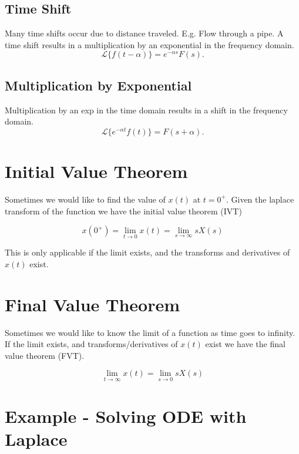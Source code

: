 \documentclass[12pt, a4paper]{report}
\begin{document}
  \subsection{Time Shift}
  Many time shifts occur due to distance traveled. E.g. Flow through a pipe. A time shift results in a multiplication by an exponential in the frequency domain.
  \[
      \mathcal{L}\{f(t-\alpha)\} = e^{-\alpha s}F(s)
    .\]

  \subsection{Multiplication by Exponential}
  Multiplication by an exp in the time domain results in a shift in the frequency domain.
  \[
      \mathcal{L}\{e^{-\alpha t}f(t)\} = F(s + \alpha)
    .\]

  \section{Initial Value Theorem}

  Sometimes we would like to find the value of $ x(t) $ at $ t = 0^+. $ Given the laplace transform of the function we have the initial value theorem (IVT)

  \begin{equation}
    x(0^+) = \lim_{t \rightarrow 0} x(t) = \lim_{s \rightarrow \infty} sX(s)
  \end{equation}

  This is only applicable if the limit exists, and the transforms and derivatives of $ x(t) $ exist.

  \section{Final Value Theorem}

  Sometimes we would like to know the limit of a function as time goes to infinity. If the limit exists, and transforms/derivatives of $ x(t) $ exist we have the final value theorem (FVT).

  \begin{equation}
    \lim_{t \rightarrow \infty} x(t) = \lim_{s \rightarrow 0} sX(s)
  \end{equation}

  \section{Example - Solving ODE with Laplace}
\end{document}
